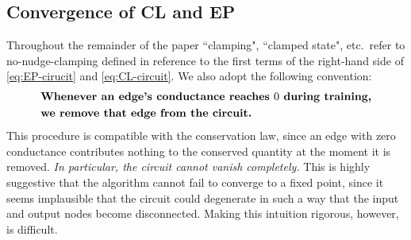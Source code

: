 \documentclass[final, 11pt, nonatbib]{elsarticle}
\theoremstyle{definition}
\theoremstyle{plain}
\numberwithin{equation}{section}
\begin{document}
\subsection{Convergence of CL and EP}
\label{Convergece Argument}
Throughout the remainder of the paper ``clamping", ``clamped state", etc.\ refer to no-nudge-clamping defined in reference to the first terms of the right-hand side of  \eqref{eq:EP-cirucit} and \eqref{eq:CL-circuit}. We also adopt the following convention:
\[
\begin{aligned}
    &\text{\textbf{Whenever an edge's conductance reaches $0$ during training,}}
    \\
    &\text{\textbf{we remove that edge from the circuit.}}
\end{aligned}
\]
This procedure is compatible with the conservation law, since an edge with
zero conductance contributes nothing to the conserved quantity at the moment it
is removed.  \textit{In particular, the circuit cannot vanish completely.}  This is
highly suggestive that the algorithm cannot fail to converge to a fixed point,
since it seems implausible that the circuit could degenerate in such a way that
the input and output nodes become disconnected. Making this intuition rigorous,
however, is difficult. 
\end{document}
